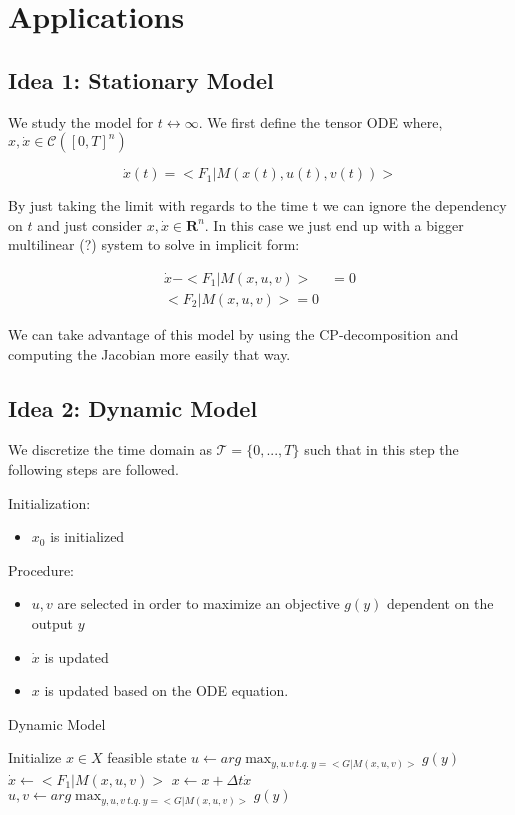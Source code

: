 \documentclass{article}
\begin{document}
\section{Applications}

\subsection{Idea 1: Stationary Model}

We study the model for $t \longleftrightarrow \infty$. We first define the tensor ODE  where, $x,\dot{x} \in \mathcal{C}([0,T]^n)$

\begin{equation}
    \dot{x}(t) = <F_1|M(x(t),u(t),v(t))> 
\end{equation}

By just taking the limit with regards to the time t we can ignore the dependency on $t$ and just consider $x, \dot{x} \in \mathbf{R}^n$. In this case we just end up with a bigger multilinear (?) system to solve in implicit form:

\begin{align}
     \dot{x} - <F_1|M(x,u,v)> &= 0 \\
     <F_2|M(x,u,v)> = 0
\end{align}

We can take advantage of this model by using the CP-decomposition and computing the Jacobian more easily that way. 

\subsection{Idea 2: Dynamic Model}
We discretize the time domain as $\mathcal{T} = \{0, ..., T\}$ such that in this step the following steps are followed. 

Initialization:
\begin{itemize}
    \item $x_0$ is initialized
\end{itemize}

Procedure:
\begin{itemize}
    \item $u,v$ are selected in order to maximize an objective $g(y)$ dependent on the output $y$
    \item $\dot{x}$ is updated
    \item $x$ is updated based on the ODE equation. 
\end{itemize}

\begin{algorithm}
\caption{Dynamic Model}
\label{alg:dynamic_model}
\begin{algorithmic}[1] %
    \State Initialize {$x \in X$} feasible state
    \State $u \gets arg \max_{y,u.v \ t.q. \ y = <G|M(x,u,v)> } g(y) $
        \State $\dot{x} \gets <F_1|M(x,u,v)>$
        \State $x \gets x + \Delta t \dot{x}$ 
        \State $u,v \gets arg \max_{y,u,v \ t.q. \ y = <G|M(x,u,v)> } g(y) $
    \EndFor
\end{algorithmic}
\end{algorithm}
\end{document}
